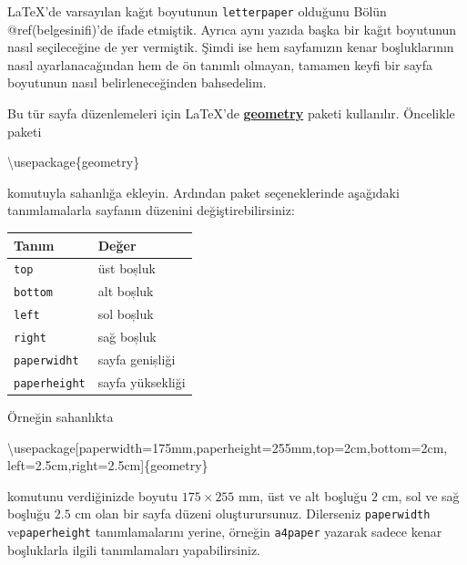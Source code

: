 \documentclass[
  letterpaper,
  DIV=11,
  numbers=noendperiod]{scrreprt}
\newenvironment{Shaded}{\begin{snugshade}}{\end{snugshade}}
\newcommand{\BuiltInTok}[1]{\textcolor[rgb]{0.00,0.23,0.31}{#1}}
\newcommand{\ExtensionTok}[1]{\textcolor[rgb]{0.00,0.23,0.31}{#1}}
\newcommand{\NormalTok}[1]{\textcolor[rgb]{0.00,0.23,0.31}{#1}}
\begin{document}
{\LaTeX}'de varsayılan kağıt boyutunun \texttt{letterpaper} olduğunu
Bölün @ref(belgesinifi)'de ifade etmiştik. Ayrıca aynı yazıda başka bir
kağıt boyutunun nasıl seçileceğine de yer vermiştik. Şimdi ise hem
sayfamızın kenar boşluklarının nasıl ayarlanacağından hem de ön tanımlı
olmayan, tamamen keyfi bir sayfa boyutunun nasıl belirleneceğinden
bahsedelim.

Bu tür sayfa düzenlemeleri için {\LaTeX}'de
\href{http://ftp.cc.uoc.gr/mirrors/CTAN/macros/latex/contrib/geometry/geometry.pdf}{\textbf{geometry}}
paketi kullanılır. Öncelikle paketi

\begin{Shaded}
\begin{Highlighting}[]
\BuiltInTok{\textbackslash{}usepackage}\NormalTok{\{}\ExtensionTok{geometry}\NormalTok{\}}
\end{Highlighting}
\end{Shaded}

komutuyla sahanlığa ekleyin. Ardından paket seçeneklerinde aşağıdaki
tanımlamalarla sayfanın düzenini değiştirebilirsiniz:

\begin{longtable}[]{@{}ll@{}}
\toprule()
Tanım & Değer \\
\midrule()
\endhead
\texttt{top} & üst boșluk \\
\texttt{bottom} & alt boșluk \\
\texttt{left} & sol boșluk \\
\texttt{right} & sağ boșluk \\
\texttt{paperwidht} & sayfa genișliği \\
\texttt{paperheight} & sayfa yüksekliği \\
\bottomrule()
\end{longtable}

Örneğin sahanlıkta

\begin{Shaded}
\begin{Highlighting}[]
\BuiltInTok{\textbackslash{}usepackage}\NormalTok{[paperwidth=175mm,paperheight=255mm,top=2cm,bottom=2cm,}
\NormalTok{left=2.5cm,right=2.5cm]\{}\ExtensionTok{geometry}\NormalTok{\}}
\end{Highlighting}
\end{Shaded}

komutunu verdiğinizde boyutu \(175\times 255\) mm, üst ve alt boşluğu
\(2\) cm, sol ve sağ boşluğu \(2.5\) cm olan bir sayfa düzeni
oluşturursunuz. Dilerseniz \texttt{paperwidth} ve\texttt{paperheight}
tanımlamalarını yerine, örneğin \texttt{a4paper} yazarak sadece kenar
boşluklarla ilgili tanımlamaları yapabilirsiniz.
\end{document}
